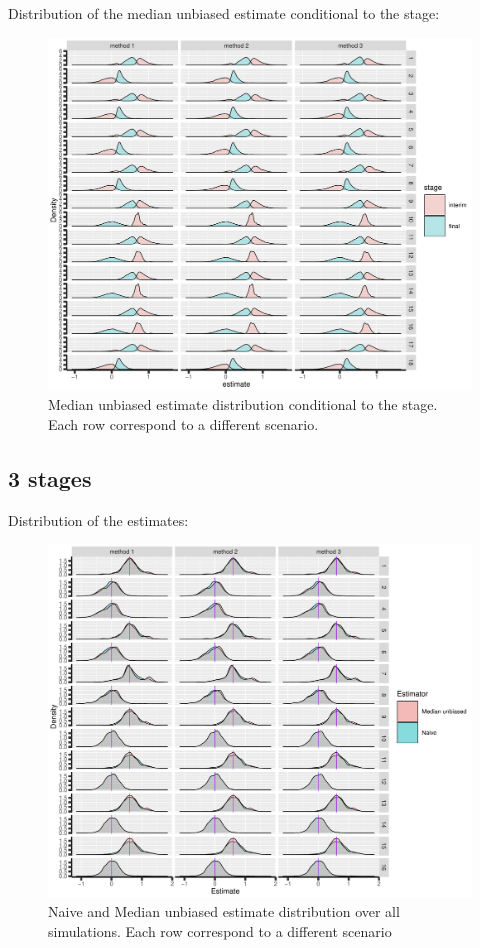 \documentclass[12pt]{article}
\begin{document}
\clearpage

Distribution of the median unbiased estimate conditional to the stage:
\begin{figure}[!h]
\centering
\includegraphics[trim={0 0 0 0},width=1\textwidth]{./figures/gg2stage-estimateC-density.pdf}
\caption{Median unbiased estimate distribution conditional to the stage. Each row correspond to a different scenario.}
\end{figure}

\clearpage

\subsection{3 stages}
\label{sec:org627302a}

Distribution of the estimates:
\begin{figure}[!h]
\centering
\includegraphics[trim={0 0 0 0},width=1\textwidth]{./figures/gg3stage-estimate-density.pdf}
\caption{Naive and Median unbiased estimate distribution over all simulations. Each row correspond to a different scenario}
\end{figure}
\end{document}
